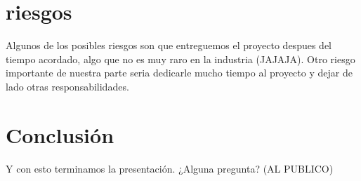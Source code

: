\documentclass[conference]{IEEEtran}
\begin{document}
\section{riesgos}
Algunos de los posibles riesgos son que entreguemos el proyecto despues del tiempo acordado, algo que no es muy raro en la industria (JAJAJA). Otro riesgo importante de nuestra parte seria dedicarle mucho tiempo al proyecto y dejar de lado otras responsabilidades.

\section{Conclusión}
Y con esto terminamos la presentación. ¿Alguna pregunta? (AL PUBLICO)

\printbibliography
\end{document}
